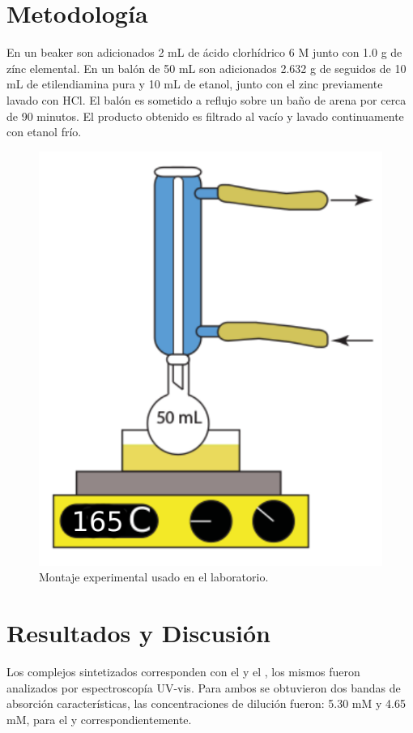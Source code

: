 \documentclass[fleqn,10pt]{SelfArx} %
\begin{document}
	\section{Metodolog\'ia}
	En un beaker son adicionados 2 mL de \'acido clorh\'idrico 6 M junto con 1.0 g de z\'inc elemental. En un bal\'on de 50 mL son adicionados 2.632 g de  seguidos de 10 mL de etilendiamina pura y 10 mL de etanol, junto con el zinc previamente lavado con HCl. El bal\'on es sometido a reflujo sobre un ba\~no de arena por cerca de 90 minutos. El producto obtenido es filtrado al vac\'io y lavado continuamente con etanol fr\'io.
	\begin{figure}[h]
		\centering
		\includegraphics[width=0.6\linewidth]{images/Montaje.pdf}
		\caption{Montaje experimental usado en el laboratorio.}
	\end{figure}	
	\pagebreak
	
	\section{Resultados y Discusi\'on}	
	Los complejos sintetizados corresponden con el  \ce{[Cr(en)3]} y el \ce{[CrCl2(H2O)4]+}, los mismos fueron analizados por espectroscop\'ia UV-vis. Para ambos se obtuvieron dos bandas de absorci\'on caracter\'isticas, las concentraciones de diluci\'on fueron: 5.30 mM y 4.65 mM, para el \ce{[Cr(en)3]} y \ce{[CrCl2(H2O)4]+} correspondientemente.
	
\end{document}
